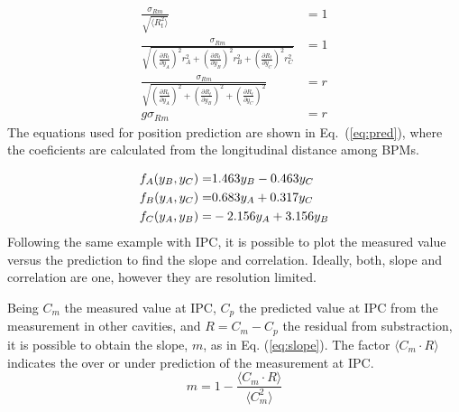 \begin{align}
 \frac{\sigma_{Rm}}{\sqrt{\langle R_t^2\rangle}}&=1\\
 \frac{\sigma_{Rm}}{\sqrt{\left(\frac{\partial R_t}{\partial y_A}\right)^2r_A^2+\left(\frac{\partial R_t}{\partial y_B}\right)^2r_B^2+\left(\frac{\partial R_t}{\partial y_C}\right)^2r_C^2}}&=1\label{eq:allr}\\
 \frac{\sigma_{Rm}}{\sqrt{\left(\frac{\partial R_t}{\partial y_A}\right)^2+\left(\frac{\partial R_t}{\partial y_B}\right)^2+\left(\frac{\partial R_t}{\partial y_C}\right)^2}}&=r\label{eq:samer}\\
 g\sigma_{Rm}&=r
\end{align}
The equations used for position prediction are shown in Eq.~(\ref{eq:pred}), where the coeficients are calculated from the longitudinal distance among BPMs.\par
\begin{align}
 f_A(y_B,y_C)=&1.463y_B -0.463y_C\notag\\
 f_B(y_A,y_C)=&0.683y_A +0.317y_C\notag\\
 f_C(y_A,y_B)=&-2.156y_A +3.156y_B\label{eq:pred}
\end{align}
Following the same example with IPC, it is possible to plot the measured value versus the prediction to find the slope and correlation. Ideally, both, slope and correlation are one, however they are resolution limited.\par
Being $C_m$ the measured value at IPC, $C_p$ the predicted value at IPC from the measurement in other cavities, and $R=C_m-C_p$ the residual from substraction, it is possible to obtain the slope, $m$, as in Eq. (\ref{eq:slope}). The factor $\langle  C_m\cdot R\rangle$ indicates the over or under prediction of the measurement at IPC.
\begin{equation}
 m=1-\frac{\langle C_m\cdot R\rangle}{\langle C_m^2\rangle}\label{eq:slope}
\end{equation}

